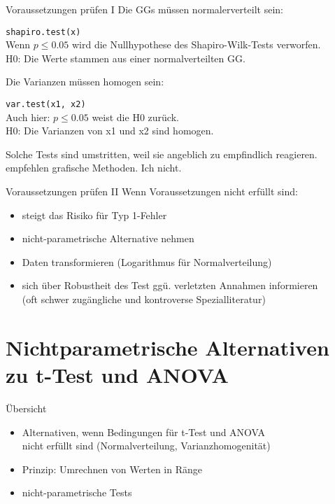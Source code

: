 \begin{frame}
  {Voraussetzungen prüfen I}
  Die \alert{GGs müssen normalerverteilt} sein:
  \begin{center}
    \texttt{shapiro.test(x)}\\
    Wenn $p\leq0.05$ wird die Nullhypothese des Shapiro-Wilk-Tests verworfen.\\
    H0: Die Werte stammen aus einer normalverteilten GG.
  \end{center}
  \Zeile
  \pause
  Die \alert{Varianzen müssen homogen sein}:
  \begin{center}
    \texttt{var.test(x1, x2)}\\
    Auch hier: $p\leq0.05$ weist die H0 zurück.\\
    H0: Die Varianzen von x1 und x2 sind homogen.
  \end{center}
\pause
  \Halbzeile
\begin{center}
  \alert{Solche Tests sind umstritten, weil sie angeblich zu empfindlich reagieren.\\
    \cite{ZuurEa2009} empfehlen \zB grafische Methoden. Ich nicht.}
\end{center}

\end{frame}


\begin{frame}
  {Voraussetzungen prüfen II}
  Wenn Voraussetzungen nicht erfüllt sind:
  \begin{itemize}[<+->]
    \item steigt das Risiko für Typ 1-Fehler
      \Zeile
    \item nicht-parametrische Alternative nehmen
    \item Daten transformieren (Logarithmus für Normalverteilung)
      \Zeile
    \item sich über Robustheit des Test ggü. verletzten Annahmen informieren\\
      (oft schwer zugängliche und kontroverse Spezialliteratur)
  \end{itemize}
\end{frame}


\section[Alternativen]{Nichtparametrische Alternativen zu t-Test und ANOVA}

\begin{frame}
  {Übersicht}
  \begin{itemize}[<+->]
    \item Alternativen, wenn Bedingungen für t-Test und ANOVA \\
      nicht erfüllt sind (Normalverteilung, Varianzhomogenität)
      \Zeile
    \item Prinzip: \alert{Umrechnen von Werten in Ränge}
    \item nicht-parametrische Tests
  \end{itemize}
\end{frame}

